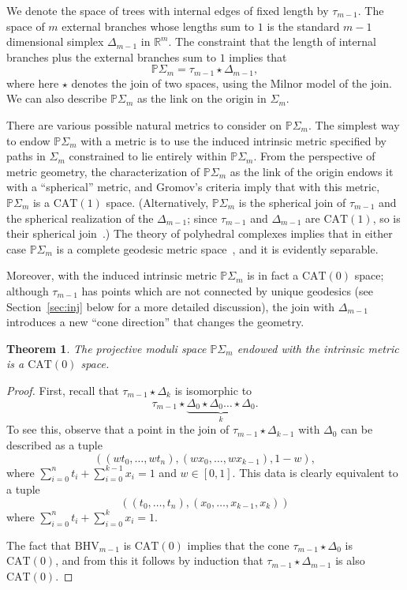 \documentclass[a4paper,11pt]{article}
\newtheorem{theorem}{Theorem}[section]
\newcommand{\CAT}{\textrm{CAT}}
\newcommand{\BHV}{\textrm{BHV}}
\begin{document}
We denote the space of trees with internal edges of fixed length by $\tau_{m-1}$.
The space of $m$ external branches whose lengths sum to $1$ is the standard $m-1$ dimensional simplex $\Delta_{m-1}$ in $\mathbb{R}^m$.
The constraint that the length of internal branches plus the external branches sum to $1$ implies that 
\[\mathbb{P}\Sigma_m = \tau_{m-1} \star \Delta_{m-1},\]
where here $\star$ denotes the join of two spaces, using the Milnor model of the join.
We can also describe $\mathbb{P}\Sigma_m$ as the link on the origin in $\Sigma_m$.

There are various possible natural metrics to consider on $\mathbb{P} \Sigma_m$.
The simplest way to endow $\mathbb{P} \Sigma_m$ with a metric is to use the induced intrinsic metric specified by paths in $\Sigma_m$ constrained to lie entirely within $\mathbb{P} \Sigma_m$.
From the perspective of metric geometry, the characterization of $\mathbb{P} \Sigma_m$ as the link of the origin endows it with a ``spherical'' metric, and Gromov's criteria imply that with this metric, $\mathbb{P} \Sigma_m$ is a $\CAT(1)$ space.
(Alternatively, $\mathbb{P} \Sigma_m$ is the spherical join of $\tau_{m-1}$ and the spherical realization of the $\Delta_{m-1}$; since $\tau_{m-1}$ and $\Delta_{m-1}$ are $\CAT(1)$, so is their spherical join~\cite[II.3.15]{bridson99}.)
The theory of polyhedral complexes implies that in either case $\mathbb{P} \Sigma_m$ is a complete geodesic metric space~\cite[I.7.19]{bridson99}, and it is evidently separable.

Moreover, with the induced intrinsic metric $\mathbb{P} \Sigma_m$ is in fact a $\CAT(0)$ space; although $\tau_{m-1}$ has points which are not connected by unique geodesics (see Section~\ref{sec:inj} below for a more detailed discussion), the join with $\Delta_{m-1}$ introduces a new ``cone direction'' that changes the geometry.

\begin{theorem}
The projective moduli space $\mathbb{P} \Sigma_m$ endowed with the intrinsic metric is a $\CAT(0)$ space.
\end{theorem}

\begin{proof}
First, recall that $\tau_{m-1} \star \Delta_{k}$ is isomorphic to 
\[
\tau_{m-1} \star \underbrace{\Delta_0 \star \Delta_0 \ldots \star \Delta_0}_{k}.
\]
To see this, observe that a point in the join of $\tau_{m-1} \star \Delta_{k-1}$ with $\Delta_0$ can be described as a tuple 
\[
\left((wt_0, \ldots, wt_n), (wx_0, \ldots, wx_{k-1}), 1-w\right),
\]
where $\sum_{i=0}^n t_i + \sum_{i=0}^{k-1} x_i = 1$ and $w \in [0,1]$.  
This data is clearly equivalent to a tuple 
\[
\left((t_0, \ldots, t_n), (x_0, \ldots, x_{k-1}, x_{k})\right)
\]
where $\sum_{i=0}^n t_i + \sum_{i=0}^k x_i = 1$.

The fact that $\BHV_{m-1}$ is $\CAT(0)$ implies that the cone $\tau_{m-1} \star \Delta_0$ is $\CAT(0)$, and from this it follows by induction that $\tau_{m-1} \star \Delta_{m-1}$ is also $\CAT(0)$.
\end{proof}
\end{document}
